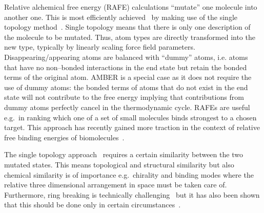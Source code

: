 \documentclass[journal=jctcce,manuscript=article]{achemso}
\begin{document}
Relative alchemical free energy (RAFE) calculations ``mutate'' one
molecule into another one.  This is most efficiently
achieved~\cite{doi:10.1021/j100056a020, Michel2010} by making use of
the single topology method~\cite{doi:10.1021/j100056a020,
  doi:10.1021/jp981628n}.  Single topology means that there is only
one description of the molecule to be mutated.  Thus, atom types are
directly transformed into the new type, typically by linearly scaling
force field parameters.  Disappearing/appearing atoms are balanced
with ``dummy'' atoms, i.e. atoms that have no non--bonded interactions
in the end state but retain the bonded terms of the original atom.
AMBER is a special case as it does not require the use of dummy atoms:
the bonded terms of atoms that do not exist in the end state will not
contribute to the free energy implying that contributions from dummy
atoms perfectly cancel in the thermodynamic cycle.  RAFEs are useful
e.g.\ in ranking which one of a set of small molecules binds strongest
to a chosen target.  This approach has recently gained more traction
in the context of relative free binding energies of
biomolecules~\cite{doi:10.1021/ja512751q}.

The single topology approach~\cite{doi:10.1021/j100056a020} requires a
certain similarity between the two mutated states.  This means
topological and structural similarity but also chemical similarity is
of importance e.g.\ chirality and binding modes where the relative
three dimensional arrangement in space must be taken care of.
Furthermore, ring breaking is technically
challenging~\cite{doi:10.1021/acs.jctc.6b00991} but it has also been
shown that this should be done only in certain
circumstances~\cite{doi:10.1021/acs.jcim.5b00057,
  doi:10.1021/jp994193s}.
\end{document}
